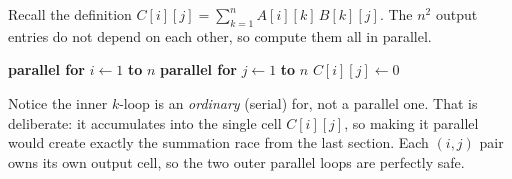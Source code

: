 Recall the definition $C[i][j] = \sum_{k=1}^{n} A[i][k]\,B[k][j]$. The $n^2$
output entries do not depend on each other, so compute them all in parallel.

\begin{algorithm}[H]
\caption{\textsc{P-Matrix-Multiply}$(A, B, C, n)$}
\textbf{parallel for} $i \gets 1$ \textbf{to} $n$\;
\Indp \textbf{parallel for} $j \gets 1$ \textbf{to} $n$\;
\Indp $C[i][j] \gets 0$\;
\Indm\Indm
\end{algorithm}

Notice the inner $k$-loop is an \emph{ordinary} (serial) for, not a parallel one.
That is deliberate: it accumulates into the single cell $C[i][j]$, so making it
parallel would create exactly the summation race from the last section. Each
$(i,j)$ pair owns its own output cell, so the two outer parallel loops are
perfectly safe.

